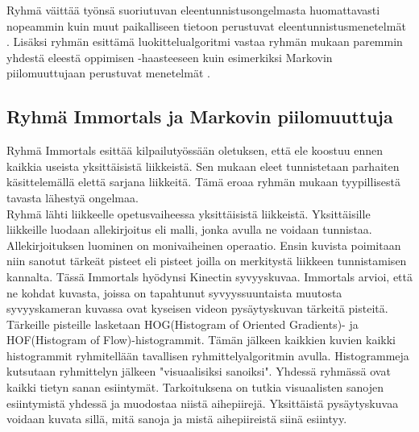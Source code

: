Ryhmä väittää työnsä suoriutuvan eleentunnistusongelmasta huomattavasti nopeammin kuin muut paikalliseen tietoon perustuvat eleentunnistusmenetelmät \citep{firstround}.
Lisäksi ryhmän esittämä luokittelualgoritmi vastaa ryhmän mukaan paremmin yhdestä eleestä oppimisen -haasteeseen kuin esimerkiksi Markovin piilomuuttujaan perustuvat menetelmät
\citep{6239179}.

\subsection{Ryhmä Immortals ja Markovin piilomuuttuja}

Ryhmä Immortals esittää kilpailutyössään oletuksen, että ele koostuu ennen kaikkia useista yksittäisistä liikkeistä. 
Sen mukaan eleet tunnistetaan parhaiten käsittelemällä elettä sarjana liikkeitä. Tämä eroaa ryhmän mukaan tyypillisestä 
tavasta lähestyä ongelmaa. \citep {6239185}\\

Ryhmä lähti liikkeelle opetusvaiheessa yksittäisistä liikkeistä. Yksittäisille liikkeille luodaan allekirjoitus eli malli,
jonka avulla ne voidaan tunnistaa. Allekirjoituksen luominen on monivaiheinen operaatio. Ensin kuvista poimitaan niin sanotut
tärkeät pisteet eli pisteet joilla on merkitystä liikkeen tunnistamisen kannalta. Tässä Immortals hyödynsi Kinectin syvyyskuvaa.
Immortals arvioi, että ne kohdat kuvasta, joissa on tapahtunut syvyyssuuntaista muutosta syvyyskameran kuvassa ovat kyseisen videon pysäytyskuvan
tärkeitä pisteitä. Tärkeille pisteille lasketaan HOG(Histogram of Oriented Gradients)- ja HOF(Histogram of Flow)-histogrammit. 
Tämän jälkeen kaikkien kuvien kaikki histogrammit ryhmitellään tavallisen ryhmittelyalgoritmin avulla.
Histogrammeja kutsutaan ryhmittelyn jälkeen "visuaalisiksi sanoiksi". Yhdessä ryhmässä ovat kaikki tietyn sanan esiintymät.
Tarkoituksena on tutkia visuaalisten sanojen esiintymistä yhdessä ja muodostaa niistä aihepiirejä. 
Yksittäistä pysäytyskuvaa voidaan kuvata sillä, mitä sanoja ja mistä aihepiireistä siinä esiintyy. \citep {6239185}\\

